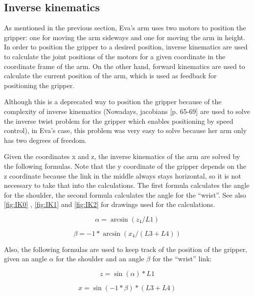 \documentclass[project_eva.tex]{subfiles}
\begin{document}
\subsection*{Inverse kinematics}
As mentioned in the previous section, Eva's arm uses two motors to position the gripper: one for moving the arm sideways 
and one for moving the arm in height. In order to position the gripper to a desired position, inverse kinematics are used 
to calculate the joint positions of the motors for a given coordinate in the coordinate frame of the arm. On the other 
hand, forward kinematics are used to calculate the current position of the arm, which is used as feedback for positioning 
the gripper. 

Although this is a deprecated way to position the gripper because of the complexity of inverse kinematics  (Nowadays, 
jacobians \cite{jacobian} [p. 65-69] are used to solve the inverse twist 
problem for the gripper which enables positioning by speed control), in Eva's case, this problem was very easy to solve 
because her arm only has two degrees of freedom. 

Given the coordinates x and z, the inverse kinematics of the arm are solved by the following formulas. Note that the y 
coordinate of the gripper depends on the z coordinate because the link in the middle always stays horizontal, so it is not 
necessary to take that into the calculations. The first formula calculates the angle for the shoulder, the second formula 
calculates the angle for the ``wrist''. See also \ref{fig:IK0} , \ref{fig:IK1} and \ref{fig:IK2} for drawings used for the calculations.

\begin{equation*}
\alpha = \arcsin(z_4/L1)
\end{equation*}

\begin{equation*}
\beta = -1 * \arcsin(x_4/(L3 + L4))
\end{equation*}

Also, the following formulas are used to 
keep track of the position of the gripper, given an angle $\alpha$ for the 
shoulder and an angle $\beta$ for the ``wrist'' link:

\begin{equation*}
z = \sin(\alpha)*L1
\end{equation*}

\begin{equation*}
x = \sin(-1 * \beta)*(L3 + L4)
\end{equation*}
\end{document}
